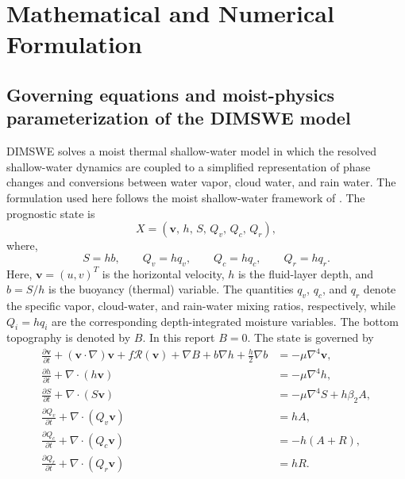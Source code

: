 \documentclass[12pt]{article}
\begin{document}
	\section{Mathematical and Numerical Formulation}\label{sec:Mathematics}
	
	\subsection{Governing equations and moist-physics parameterization of the DIMSWE model}
	DIMSWE solves a moist thermal shallow-water model in which the resolved shallow-water dynamics are coupled to a simplified representation of phase changes and conversions between water vapor, cloud water, and rain water. The formulation used here follows the moist shallow-water framework of \cite{hartney2026exploring}. The prognostic state is
	\begin{equation}
		X =
		\left(
		\mathbf{v},\,h,\,S,\,Q_v,\,Q_c,\,Q_r
		\right),
		\label{eq:state}
	\end{equation}
	where,
	\begin{equation}
		S = hb,
		\qquad
		Q_v = hq_v,
		\qquad
		Q_c = hq_c,
		\qquad
		Q_r = hq_r.
		\label{eq:specific_variables}
	\end{equation}
	Here, $\mathbf{v}=(u,v)^T$ is the horizontal velocity, $h$ is the fluid-layer depth, and $b=S/h$ is the buoyancy (thermal) variable. The quantities 	$q_v$, $q_c$, and $q_r$ denote the specific vapor, cloud-water, and 	rain-water mixing ratios, respectively, while
	$Q_i=hq_i$ are the corresponding depth-integrated moisture variables. The bottom topography is denoted by $B$. In this report $B=0$. 
	The state is governed by
	\begin{align}
		\frac{\partial \mathbf{v}}{\partial t}
		+(\mathbf{v}\cdot\nabla)\mathbf{v}
		+f\mathcal{R}(\mathbf{v})
		+\nabla B
		+b\nabla h
		+\frac{h}{2}\nabla b
		&=
		-\mu\nabla^4\mathbf{v},
		\label{eq:momentum}
		\\
		\frac{\partial h}{\partial t}
		+\nabla\cdot(h\mathbf{v})
		&=
		-\mu\nabla^4 h,
		\label{eq:depth}
		\\
		\frac{\partial S}{\partial t}
		+\nabla\cdot(S\mathbf{v})
		&=
		-\mu\nabla^4 S
		+h\beta_2 A,
		\label{eq:thermal}
		\\
		\frac{\partial Q_v}{\partial t}
		+\nabla\cdot(Q_v\mathbf{v})
		&=
		hA,
		\label{eq:vapor}
		\\
		\frac{\partial Q_c}{\partial t}
		+\nabla\cdot(Q_c\mathbf{v})
		&=
		-h(A+R),
		\label{eq:cloud}
		\\
		\frac{\partial Q_r}{\partial t}
		+\nabla\cdot(Q_r\mathbf{v})
		&=
		hR.
		\label{eq:rain}
	\end{align}
\end{document}
